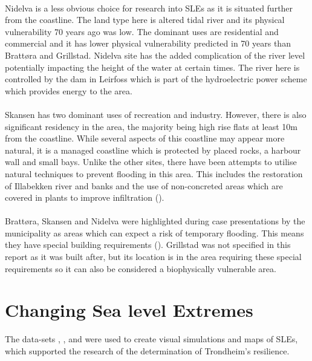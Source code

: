 \paragraph{}
Nidelva is a less obvious choice for research into SLEs as it is situated further from the coastline. The land type here is altered tidal river and its physical vulnerability 70 years ago was low. The dominant uses are residential and commercial and it has lower physical vulnerability predicted in 70 years than Brattøra and Grillstad. Nidelva site has the added complication of the river level potentially impacting the height of the water at certain times. The river here is controlled by the dam in Leirfoss which is part of the hydroelectric power scheme which provides energy to the area.
\paragraph{}
Skansen has two dominant uses of recreation and industry. However, there is also significant residency in the area, the majority being high rise flats at least 10m from the coastline. While several aspects of this coastline may appear more natural, it is a managed coastline which is protected by placed rocks, a harbour wall and small bays. Unlike the other sites, there have been attempts to utilise natural techniques to prevent flooding in this area. This includes the restoration of Illabekken river and banks and the use of non-concreted areas which are covered in plants to improve infiltration (\cite{selliseth_ilabekken_2021}).
\paragraph{}

\paragraph{}
Brattøra, Skansen and Nidelva were highlighted during case presentations by the municipality as areas which can expect a risk of temporary flooding. This means they have special building requirements (\cite{hanssen_saksframlegg_2013}). Grillstad was not specified in this report as it was built after, but its location is in the area requiring these special requirements so it can also be considered a biophysically vulnerable area.  

\section{Changing Sea level Extremes}
The data-sets  \cite{geonorge_stormflo_nodate} , \cite{kartverket_se_2021}, \cite{stormflo_database_stormflo_2021} and \cite{ipcc_sea_2021} were used to create visual simulations and maps of SLEs, which supported the research of the determination of Trondheim's resilience. 

